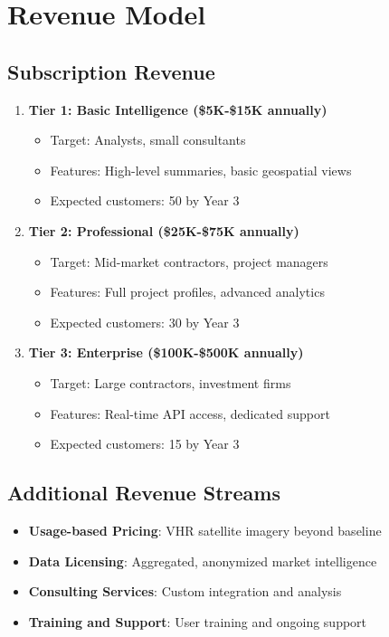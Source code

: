 \documentclass[business]{../templates/infraradar-main}
\begin{document}
\section{Revenue Model}

\subsection{Subscription Revenue}
\begin{enumerate}
    \item \textbf{Tier 1: Basic Intelligence (\$5K-\$15K annually)}
    \begin{itemize}
        \item Target: Analysts, small consultants
        \item Features: High-level summaries, basic geospatial views
        \item Expected customers: 50 by Year 3
    \end{itemize}
    
    \item \textbf{Tier 2: Professional (\$25K-\$75K annually)}
    \begin{itemize}
        \item Target: Mid-market contractors, project managers
        \item Features: Full project profiles, advanced analytics
        \item Expected customers: 30 by Year 3
    \end{itemize}
    
    \item \textbf{Tier 3: Enterprise (\$100K-\$500K annually)}
    \begin{itemize}
        \item Target: Large contractors, investment firms
        \item Features: Real-time API access, dedicated support
        \item Expected customers: 15 by Year 3
    \end{itemize}
\end{enumerate}

\subsection{Additional Revenue Streams}
\begin{itemize}
    \item \textbf{Usage-based Pricing}: VHR satellite imagery beyond baseline
    \item \textbf{Data Licensing}: Aggregated, anonymized market intelligence
    \item \textbf{Consulting Services}: Custom integration and analysis
    \item \textbf{Training and Support}: User training and ongoing support
\end{itemize}
\end{document}
